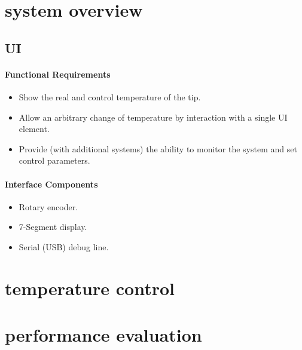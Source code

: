 
\section{system overview}
\subsection{UI}
\paragraph{Functional Requirements}

\begin{itemize}
	\item Show the real and control temperature of the tip.
	\item Allow an arbitrary change of temperature by interaction
		with a single UI element.
	\item Provide (with additional systems) the ability to monitor
		the system and set control parameters.
\end{itemize}
\paragraph{Interface Components}
\begin{itemize}
	\item Rotary encoder.
	\item 7-Segment display.
	\item Serial (USB) debug line.
\end{itemize}

\section{temperature control}

\section{performance evaluation}



